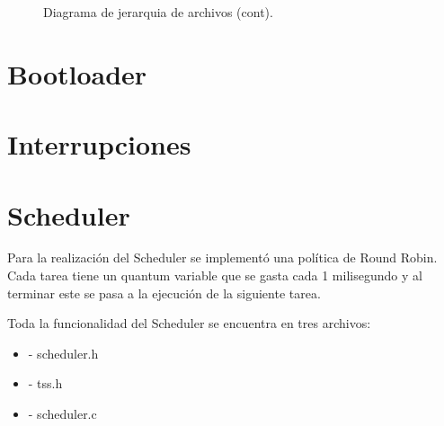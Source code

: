 \documentclass[a4paper,10pt]{article}
\begin{document}
\begin{figure}[H]
\centering
{}
\caption{Diagrama de jerarquia de archivos (cont).}
\end{figure}


\section{Bootloader}
\newpage


\newpage
\section{Interrupciones}

\section{Scheduler}

Para la realizaci\'on del Scheduler se implement\'o una pol\'itica de Round Robin. Cada tarea tiene un quantum variable que se gasta cada 1 milisegundo y al terminar este se pasa a la ejecuci\'on de la siguiente tarea.

Toda la funcionalidad del Scheduler se encuentra en tres archivos:
\begin{itemize}
\item	- scheduler.h
\item	- tss.h
\item	- scheduler.c
\end{itemize}
\end{document}
